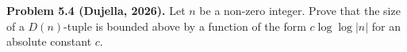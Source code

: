\textbf{Problem 5.4 (Dujella, 2026).} Let $n$ be a non-zero integer. Prove that the size of a $D(n)$-tuple is bounded above by a function of the form $c\log\log|n|$ for an absolute constant $c$.
